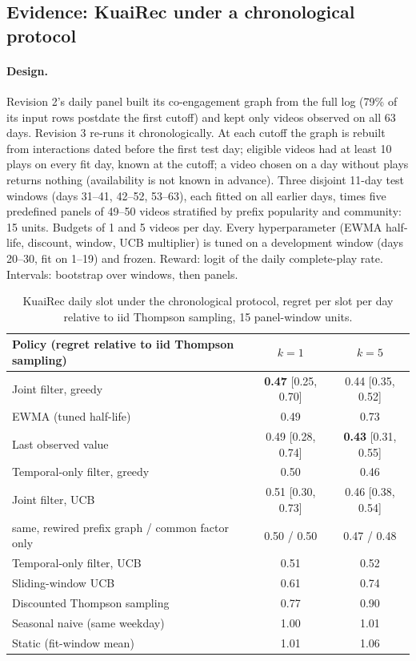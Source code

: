 \documentclass[11pt]{article}
\theoremstyle{definition}
\theoremstyle{remark}
\begin{document}
\subsection{Evidence: KuaiRec under a chronological protocol}

\paragraph{Design.} Revision 2's daily panel built its co-engagement graph from the full log (79\% of its input rows postdate the first cutoff) and kept only videos observed on all 63 days. Revision 3 re-runs it chronologically. At each cutoff the graph is rebuilt from interactions dated before the first test day; eligible videos had at least 10 plays on every fit day, known at the cutoff; a video chosen on a day without plays returns nothing (availability is not known in advance). Three disjoint 11-day test windows (days 31--41, 42--52, 53--63), each fitted on all earlier days, times five predefined panels of 49--50 videos stratified by prefix popularity and community: 15 units. Budgets of 1 and 5 videos per day. Every hyperparameter (EWMA half-life, discount, window, UCB multiplier) is tuned on a development window (days 20--30, fit on 1--19) and frozen. Reward: logit of the daily complete-play rate. Intervals: bootstrap over windows, then panels.

\begin{table}[t]\centering\small
\begin{tabular}{lcc}
\toprule
Policy (regret relative to iid Thompson sampling) & $k=1$ & $k=5$ \\
\midrule
Joint filter, greedy & \textbf{0.47} [0.25, 0.70] & 0.44 [0.35, 0.52] \\
EWMA (tuned half-life) & 0.49 & 0.73 \\
Last observed value & 0.49 [0.28, 0.74] & \textbf{0.43} [0.31, 0.55] \\
Temporal-only filter, greedy & 0.50 & 0.46 \\
Joint filter, UCB & 0.51 [0.30, 0.73] & 0.46 [0.38, 0.54] \\
\quad same, rewired prefix graph / common factor only & 0.50 / 0.50 & 0.47 / 0.48 \\
Temporal-only filter, UCB & 0.51 & 0.52 \\
Sliding-window UCB & 0.61 & 0.74 \\
Discounted Thompson sampling & 0.77 & 0.90 \\
Seasonal naive (same weekday) & 1.00 & 1.01 \\
Static (fit-window mean) & 1.01 & 1.06 \\
\bottomrule
\end{tabular}
\caption{KuaiRec daily slot under the chronological protocol, regret per slot per day relative to iid Thompson sampling, 15 panel-window units.}\label{tab:chrono}
\end{table}
\end{document}
